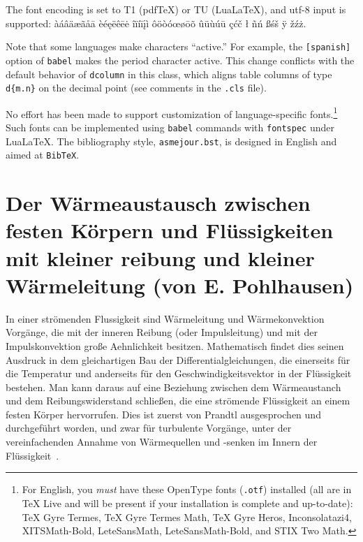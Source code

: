 \documentclass[balance,nocopyright,upint,varvw,hyphenate,barcolor=Goldenrod3,german]{asmejour}%
\newcommand*\pdfTeX{pdf\TeX}
\newcommand*\LuaLaTeX{Lua\LaTeX}
\begin{document}
The font encoding is set to T1 (\pdfTeX) or TU (\LuaLaTeX), and utf-8 input is supported:
\ifluatex{}\fi
àáâäæãåā  èéęëêēė  îïíīįì ôöòóœøōõ ûüùúū çćč ł ñń ßśš ÿ žźż.

Note that some languages make characters ``active.'' For example, the \texttt{[spanish]} option of \texttt{babel} makes the period character active.  This change conflicts with the default behavior of \texttt{dcolumn} in this class, which aligns table columns of type \verb|d{m.n}| on the decimal point (see comments in the \texttt{.cls} file).

No effort has been made to support customization of language-specific fonts.\footnote{For English, you \emph{must} have these OpenType fonts (\texttt{.otf}) installed (all are in TeX Live and will be present if your installation is complete and up-to-date): TeX Gyre Termes, TeX Gyre Termes Math, TeX Gyre Heros, Inconsolatazi4, XITSMath-Bold, LeteSansMath, LeteSansMath-Bold, and STIX Two Math.} Such fonts can be implemented using \texttt{babel} commands with \texttt{fontspec} under \LuaLaTeX. The bibliography style, \texttt{asmejour.bst}, is designed in English and aimed at \texttt{BibTeX}.



\section{Der Wärmeaustausch zwischen festen Körpern und Flüssigkeiten mit kleiner reibung und kleiner Wärmeleitung (von E. Pohlhausen)\label{app:pohlhausen}}

In einer strömenden Flussigkeit sind Wärmeleitung und Wärmekonvektion Vorgänge, die mit der inneren Reibung (oder Impulsleitung) und mit der Impulskonvektion große Aehnlichkeit besitzen. Mathematisch findet dies seinen Ausdruck in dem gleichartigen Bau der Differentialgleichungen, die einerseits für die Temperatur und anderseits für den Geschwindigkeitsvektor in der Flüssigkeit bestehen. Man kann daraus auf eine Beziehung
zwischen dem Wärmeaustanch und dem Reibungswiderstand schließen, die eine strömende Flüssigkeit an einem festen Körper hervorrufen. Dies ist zuerst von Prandtl ausgesprochen und durchgeführt worden, und zwar für turbulente Vorgänge, unter der vereinfachenden Annahme von Wärmequellen und -senken im Innern der Flüssigkeit~\cite{pohlhausen1921}.
\end{document}

